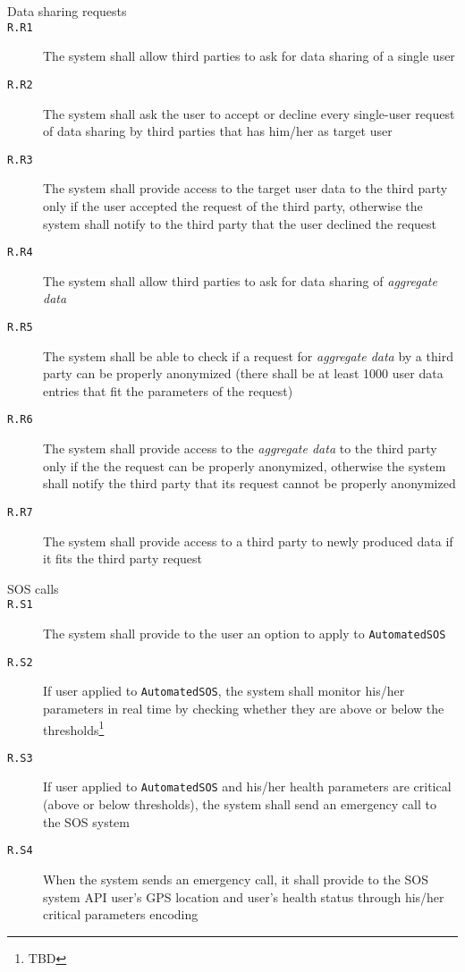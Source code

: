 \begin{description}
      \item[Data sharing requests]
      \item[\texttt{R.R1}] The system shall allow third parties to ask for data sharing of a single user
      \item[\texttt{R.R2}] The system shall ask the user to accept or decline every single-user request of data sharing by third parties that has him/her as target user
      \item[\texttt{R.R3}] The system shall provide access to the target user data to the third party only if the user accepted the request of the third party, otherwise the system shall notify to the third party that the user declined the request
      \item[\texttt{R.R4}] The system shall allow third parties to ask for data sharing of \textit{aggregate data}
      \item[\texttt{R.R5}] The system shall be able to check if a request for \textit{aggregate data} by a third party can be properly anonymized (there shall be at least 1000 user data entries that fit the parameters of the request)
      \item[\texttt{R.R6}] The system shall provide access to the \textit{aggregate data} to the third party only if the the request can be properly anonymized, otherwise the system shall notify the third party that its request cannot be properly anonymized
      \item[\texttt{R.R7}] The system shall provide access to a third party to newly produced data if it fits the third party request

      \item[SOS calls]
      \item[\texttt{R.S1}] The system shall provide to the user an option to apply to \texttt{AutomatedSOS}
      \item[\texttt{R.S2}] If user applied to \texttt{AutomatedSOS}, the system shall monitor his/her parameters in real time by checking whether they are above or below the thresholds\footnote{TBD
      }
      \item[\texttt{R.S3}] If user applied to \texttt{AutomatedSOS} and his/her health parameters are critical (above or below thresholds), the system shall send an emergency call to the SOS system
      \item[\texttt{R.S4}] When the system sends an emergency call, it shall provide to the SOS system API user's GPS location and user's health status through his/her critical parameters encoding

    \end{description}



